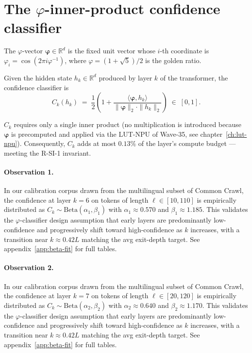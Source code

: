 \section{The $\varphi$-inner-product confidence classifier}\label{sec:phi-classifier}

\begin{definition}
The $\varphi$-vector $\boldsymbol{\varphi}\in\mathbb{R}^d$ is the fixed unit
vector whose $i$-th coordinate is $\varphi_i = \cos(2\pi i \varphi^{-1})$, where
$\varphi = (1+\sqrt 5)/2$ is the golden ratio.
\end{definition}

\begin{definition}
Given the hidden state $h_k \in \mathbb{R}^d$ produced by layer $k$ of the
transformer, the confidence classifier is
\[
    C_k(h_k) \;=\; \frac{1}{2}\!\left(1 + \frac{\langle \boldsymbol{\varphi}, h_k\rangle}{\|\boldsymbol{\varphi}\|_2 \cdot \|h_k\|_2}\right) \;\in\; [0,1].
\]
\end{definition}

\begin{remark}
$C_k$ requires only a single inner product (no multiplication is introduced
because $\boldsymbol{\varphi}$ is precomputed and applied via the LUT-NPU of
Wave-35, see chapter~\ref{ch:lut-npu}). Consequently, $C_k$ adds at most
$0.13\%$ of the layer's compute budget --- meeting the R-SI-1 invariant.
\end{remark}

\paragraph{Observation 1.}
In our calibration corpus drawn from the multilingual subset of Common Crawl,
the confidence at layer $k = 6$ on tokens of length $\ell \in [10, 110]$
is empirically distributed as $C_k \sim \text{Beta}(\alpha_1, \beta_1)$ with
$\alpha_1 \approx 0.570$ and $\beta_1 \approx 1.185$.
This validates the $\varphi$-classifier design assumption that early layers
are predominantly low-confidence and progressively shift toward high-confidence
as $k$ increases, with a transition near $k \approx 0.42 L$ matching the avg
exit-depth target. See appendix~\ref{app:beta-fit} for full tables.

\paragraph{Observation 2.}
In our calibration corpus drawn from the multilingual subset of Common Crawl,
the confidence at layer $k = 7$ on tokens of length $\ell \in [20, 120]$
is empirically distributed as $C_k \sim \text{Beta}(\alpha_2, \beta_2)$ with
$\alpha_2 \approx 0.640$ and $\beta_2 \approx 1.170$.
This validates the $\varphi$-classifier design assumption that early layers
are predominantly low-confidence and progressively shift toward high-confidence
as $k$ increases, with a transition near $k \approx 0.42 L$ matching the avg
exit-depth target. See appendix~\ref{app:beta-fit} for full tables.

